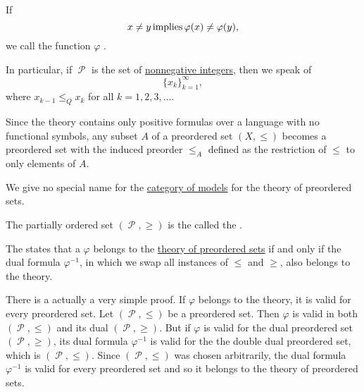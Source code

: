 \begin{definition}
\begin{thmenum}[series=def:preordered_set]
    If
    \begin{equation*}
      x \neq y \T{implies} \varphi(x) \neq \varphi(y),
    \end{equation*}
    we call the function \( \varphi \) .

    In particular, if \( \mscrP \) is the set of \hyperref[rem:peano_arithmetic_zero/nonnegative]{nonnegative integers}, then we speak of 
    \begin{equation*}
      \{ x_k \}_{k=1}^\infty,
    \end{equation*}
    where \( x_{k-1} \leq_Q x_k \) for all \( k = 1, 2, 3, \ldots \).

     Since the theory contains only positive formulas over a language with no functional symbols, any subset \( A \) of a preordered set \( (X, \leq) \) becomes a preordered set with the induced preorder \( \leq_A \) defined as the restriction of \( \leq \) to only elements of \( A \).

     We give no special name for the \hyperref[def:category_of_first_order_models]{category of models} for the theory of preordered sets.

     The partially ordered set \( (\mscrP, \geq) \) is the called the .

    The  states that a \( \varphi \) belongs to the \hyperref[def:preordered_set/theory]{theory of preordered sets} if and only if the dual formula \( \varphi^{-1} \), in which we swap all instances of \( \leq \) and \( \geq \), also belongs to the theory.

    There is a actually a very simple proof. If \( \varphi \) belongs to the theory, it is valid for every preordered set. Let \( (\mscrP, \leq) \) be a preordered set. Then \( \varphi \) is valid in both \( (\mscrP, \leq) \) and its dual \( (\mscrP, \geq) \). But if \( \varphi \) is valid for the dual preordered set \( (\mscrP, \geq) \), its dual formula \( \varphi^{-1} \) is valid for the the double dual preordered set, which is \( (\mscrP, \leq) \). Since \( (\mscrP, \leq) \) was chosen arbitrarily, the dual formula \( \varphi^{-1} \) is valid for every preordered set and so it belongs to the theory of preordered sets.


\end{thmenum}
\end{definition}
